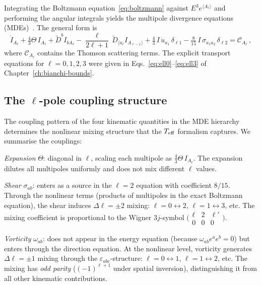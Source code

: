 Integrating the Boltzmann equation~\eqref{eq:boltzmann} against
$E^3 e^{\langle A_\ell\rangle}$ and performing the angular
integrals yields the multipole divergence equations
(MDEs)~\cite{MaartensGE1999,ChallinorLasenby1999}.  The general
form is
\begin{equation}\label{eq:MDE-general-teff}
\dot{I}_{A_\ell}
+ \tfrac{4}{3}\Theta\,I_{A_\ell}
+ \tilde{D}^b I_{bA_\ell}
- \frac{\ell}{2\ell+1}\,\tilde{D}_{\langle a_\ell}
  I_{A_{\ell-1}\rangle}
+ \tfrac{4}{3}\,I\,\dot{u}_{a_1}\,\delta_{\ell 1}
- \tfrac{8}{15}\,I\,\sigma_{a_1 a_2}\,\delta_{\ell 2}
= \mathcal{C}_{A_\ell}\,,
\end{equation}
where $\mathcal{C}_{A_\ell}$ contains the Thomson scattering
terms.  The explicit transport equations for
$\ell = 0, 1, 2, 3$ were given in
Eqs.~\eqref{eq:ell0}--\eqref{eq:ell3} of
Chapter~\ref{ch:bianchi-bounds}.


\subsection{The $\ell$-pole coupling structure}
\label{sec:ell-coupling}

The coupling pattern of the four kinematic quantities in the
MDE hierarchy determines the nonlinear mixing structure that
the $T_{\mathrm{eff}}$ formalism captures.  We summarise the couplings:

\emph{Expansion} $\Theta$: diagonal in $\ell$, scaling each
multipole as $\frac{4}{3}\Theta\,I_{A_\ell}$.  The expansion
dilutes all multipoles uniformly and does not mix different
$\ell$ values.

\emph{Shear} $\sigma_{ab}$: enters as a source in the
$\ell = 2$ equation with coefficient $8/15$.  Through the
nonlinear terms (products of multipoles in the exact Boltzmann
equation), the shear induces $\Delta\ell = \pm 2$ mixing:
$\ell = 0 \leftrightarrow 2$,
$\ell = 1 \leftrightarrow 3$, etc.  The mixing coefficient is
proportional to the Wigner $3j$-symbol
$\bigl(\begin{smallmatrix} \ell & 2 & \ell' \\
0 & 0 & 0 \end{smallmatrix}\bigr)$.

\emph{Vorticity} $\omega_{ab}$: does not appear in the energy
equation (because $\omega_{ab}e^a e^b = 0$) but enters through
the direction equation.  At the nonlinear level, vorticity
generates $\Delta\ell = \pm 1$ mixing through the
$\varepsilon_{abc}$-structure:
$\ell = 0 \leftrightarrow 1$,
$\ell = 1 \leftrightarrow 2$, etc.  The mixing has
\emph{odd parity} ($(-1)^{\ell+1}$ under spatial inversion),
distinguishing it from all other kinematic contributions.

